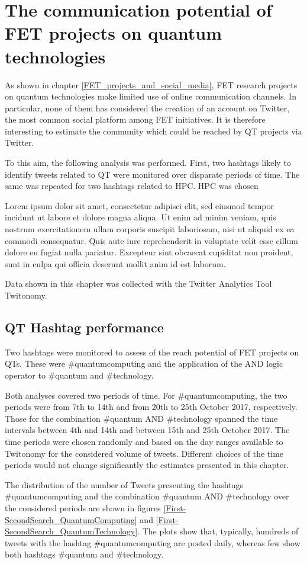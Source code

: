 \chapter{The communication potential of FET projects on quantum technologies}
As shown in chapter \ref{FET_projects_and_social_media}, FET research projects on quantum technologies make limited use of online communication channels. In particular, none of them has considered the creation of an account on Twitter, the most common social platform among FET initiatives. It is therefore interesting to estimate the community which could be reached by QT projects via Twitter.

To this aim, the following analysis was performed. First, two hashtags likely to identify tweets related to QT were monitored over disparate periods of time. The same was repeated for two hashtags related to HPC. HPC was chosen   
 
Lorem ipsum dolor sit amet, consectetur adipisci elit, sed eiusmod tempor incidunt ut labore et dolore magna aliqua. Ut enim ad minim veniam, quis nostrum exercitationem ullam corporis suscipit laboriosam, nisi ut aliquid ex ea commodi consequatur. Quis aute iure reprehenderit in voluptate velit esse cillum dolore eu fugiat nulla pariatur. Excepteur sint obcaecat cupiditat non proident, sunt in culpa qui officia deserunt mollit anim id est laborum.

Data shown in this chapter was collected with the Twitter Analytics Tool Twitonomy. 

\section{QT Hashtag performance}
Two hashtags were monitored to assess of the reach potential of FET projects on QTs. These were \#quantumcomputing and the application of the AND logic operator to \#quantum and \#technology. 

Both analyses covered two periods of time. For \#quantumcomputing, the two periods were from 7th to 14th and from 20th to 25th October 2017, respectively. Those for the combination \#quantum AND \#technology spanned the time intervals between 4th and 14th and between 15th and 25th October 2017. The time periods were chosen randomly and based on the day ranges available to Twitonomy for the considered volume of tweets. Different choices of the time periods would not change significantly the estimates presented in this chapter.  

The distribution of the number of Tweets presenting the hashtags \#quantumcomputing and the combination \#quantum AND \#technology over the considered periods are shown in figures \ref{First-SecondSearch_QuantumComputing} and \ref{First-SecondSearch_QuantumTechnology}. The plots show that, typically, hundreds of tweets with the hashtag \#quantumcomputing are posted daily, whereas few show both hashtags \#quantum and \#technology. 

